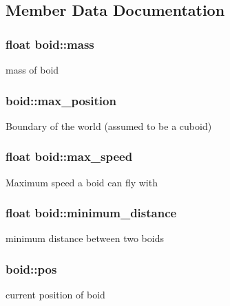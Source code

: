 \subsection{Member Data Documentation}
\subsubsection[{\texorpdfstring{mass}{mass}}]{\setlength{\rightskip}{0pt plus 5cm}float boid\+::mass}\hypertarget{classboid_a09f01e18113bd347649c44876b78b438}{}\label{classboid_a09f01e18113bd347649c44876b78b438}
mass of boid 
\subsubsection[{\texorpdfstring{max\+\_\+position}{max_position}}]{ boid\+::max\+\_\+position}\hypertarget{classboid_ac60a8859a11a09420c0800004f70d624}{}\label{classboid_ac60a8859a11a09420c0800004f70d624}
Boundary of the world (assumed to be a cuboid) 
\subsubsection[{\texorpdfstring{max\+\_\+speed}{max_speed}}]{\setlength{\rightskip}{0pt plus 5cm}float boid\+::max\+\_\+speed}\hypertarget{classboid_ac03185a7bed8491922193b42b2716f3c}{}\label{classboid_ac03185a7bed8491922193b42b2716f3c}
Maximum speed a boid can fly with 
\subsubsection[{\texorpdfstring{minimum\+\_\+distance}{minimum_distance}}]{\setlength{\rightskip}{0pt plus 5cm}float boid\+::minimum\+\_\+distance}\hypertarget{classboid_a95718cee2ea6ae5b1c19fa992d24db21}{}\label{classboid_a95718cee2ea6ae5b1c19fa992d24db21}
minimum distance between two boids 
\subsubsection[{\texorpdfstring{pos}{pos}}]{ boid\+::pos}\hypertarget{classboid_a7d96bcb0f27af38264d7bc0c596d23b5}{}\label{classboid_a7d96bcb0f27af38264d7bc0c596d23b5}
current position of boid 
